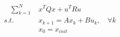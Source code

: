 \documentclass[preview]{standalone}
\begin{document}
\begin{align*}
\quad \sum_{k=1}^N \; &x^TQx + u^T R u \\ s.t. \quad &x_{k+1} = Ax_k + Bu_k, \quad \forall k \\ &x_0 = x_{init}
\end{align*}
\end{document}
